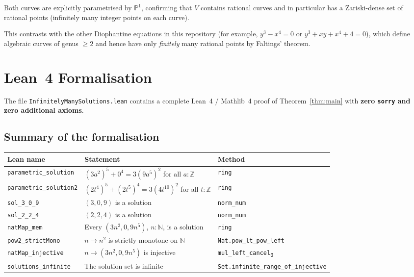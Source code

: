 \documentclass[12pt,a4paper]{article}
\theoremstyle{definition}
\newcommand{\Z}{\mathbb{Z}}
\newcommand{\N}{\mathbb{N}}
\begin{document}
Both curves are explicitly parametrised by $\mathbb{P}^1$, confirming that $V$ contains
rational curves and in particular has a Zariski-dense set of rational points
(infinitely many integer points on each curve).

This contrasts with the other Diophantine equations in this repository (for example,
$y^3 - x^4 = 0$ or $y^3 + xy + x^4 + 4 = 0$), which define algebraic curves of genus
$\geq 2$ and hence have only \emph{finitely} many rational points by Faltings' theorem.

\section{Lean~4 Formalisation}\label{sec:lean}

The file \texttt{InfinitelyManySolutions.lean} contains a complete Lean~4 / Mathlib~4
proof of Theorem~\ref{thm:main} with \textbf{zero \texttt{sorry} and zero additional axioms}.

\subsection{Summary of the formalisation}

\begin{center}
\begin{tabular}{lll}
  \toprule
  Lean name & Statement & Method \\
  \midrule
  \texttt{parametric\_solution} & $(3a^2)^5 + 0^4 = 3(9a^5)^2$ for all $a:\Z$ & \texttt{ring} \\
  \texttt{parametric\_solution2} & $(2t^4)^5 + (2t^5)^4 = 3(4t^{10})^2$ for all $t:\Z$ & \texttt{ring} \\
  \texttt{sol\_3\_0\_9} & $(3, 0, 9)$ is a solution & \texttt{norm\_num} \\
  \texttt{sol\_2\_2\_4} & $(2, 2, 4)$ is a solution & \texttt{norm\_num} \\
  \texttt{natMap\_mem} & Every $(3n^2, 0, 9n^5)$, $n:\N$, is a solution & \texttt{ring} \\
  \texttt{pow2\_strictMono} & $n \mapsto n^2$ is strictly monotone on $\N$ & \texttt{Nat.pow\_lt\_pow\_left} \\
  \texttt{natMap\_injective} & $n \mapsto (3n^2, 0, 9n^5)$ is injective & \texttt{mul\_left\_cancel\textsubscript{0}} \\
  \texttt{solutions\_infinite} & The solution set is infinite & \texttt{Set.infinite\_range\_of\_injective} \\
  \bottomrule
\end{tabular}
\end{center}
\end{document}
